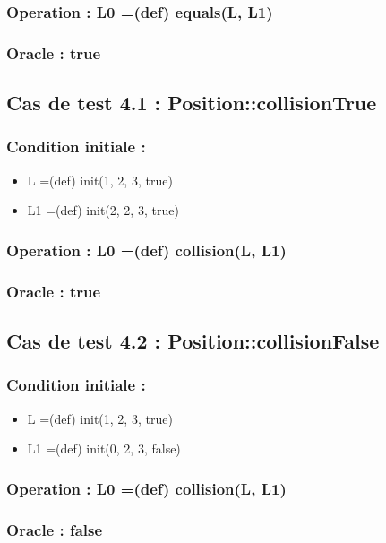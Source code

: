 \documentclass[11pt]{article}
\begin{document}
\subsubsection{Operation : L0 =(def) equals(L, L1)}
\label{sec-1.11.2}

\subsubsection{Oracle : true}
\label{sec-1.11.3}




\subsection{Cas de test 4.1 : Position::collisionTrue}
\label{sec-1.12}

\subsubsection{Condition initiale :}
\label{sec-1.12.1}

\begin{itemize}

\item L =(def) init(1, 2, 3, true)\\
\label{sec-1.12.1.1}


\item L1 =(def) init(2, 2, 3, true)\\
\label{sec-1.12.1.2}

\end{itemize} %
\subsubsection{Operation : L0 =(def) collision(L, L1)}
\label{sec-1.12.2}

\subsubsection{Oracle : true}
\label{sec-1.12.3}


\subsection{Cas de test 4.2 : Position::collisionFalse}
\label{sec-1.13}

\subsubsection{Condition initiale :}
\label{sec-1.13.1}

\begin{itemize}

\item L =(def) init(1, 2, 3, true)\\
\label{sec-1.13.1.1}


\item L1 =(def) init(0, 2, 3, false)\\
\label{sec-1.13.1.2}

\end{itemize} %
\subsubsection{Operation : L0 =(def) collision(L, L1)}
\label{sec-1.13.2}

\subsubsection{Oracle : false}
\label{sec-1.13.3}
\end{document}
